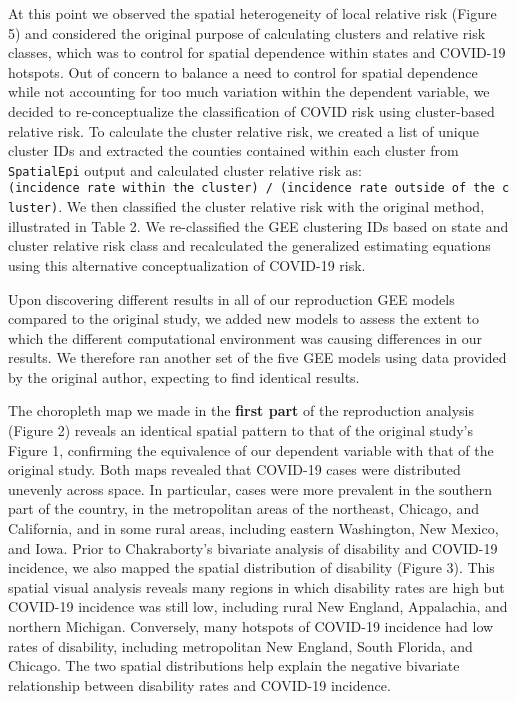 \documentclass[
]{article}
\begin{document}
At this point we observed the spatial heterogeneity of local relative
risk (Figure 5) and considered the original purpose of calculating
clusters and relative risk classes, which was to control for spatial
dependence within states and COVID-19 hotspots. Out of concern to
balance a need to control for spatial dependence while not accounting
for too much variation within the dependent variable, we decided to
re-conceptualize the classification of COVID risk using cluster-based
relative risk. To calculate the cluster relative risk, we created a list
of unique cluster IDs and extracted the counties contained within each
cluster from \texttt{SpatialEpi} output and calculated cluster relative
risk as:
\texttt{(incidence\ rate\ within\ the\ cluster)\ /\ (incidence\ rate\ outside\ of\ the\ cluster)}.
We then classified the cluster relative risk with the original method,
illustrated in Table 2. We re-classified the GEE clustering IDs based on
state and cluster relative risk class and recalculated the generalized
estimating equations using this alternative conceptualization of
COVID-19 risk.

Upon discovering different results in all of our reproduction GEE models
compared to the original study, we added new models to assess the extent
to which the different computational environment was causing differences
in our results. We therefore ran another set of the five GEE models
using data provided by the original author, expecting to find identical
results.

The choropleth map we made in the \textbf{first part} of the
reproduction analysis (Figure 2) reveals an identical spatial pattern to
that of the original study's Figure 1, confirming the equivalence of our
dependent variable with that of the original study. Both maps revealed
that COVID-19 cases were distributed unevenly across space. In
particular, cases were more prevalent in the southern part of the
country, in the metropolitan areas of the northeast, Chicago, and
California, and in some rural areas, including eastern Washington, New
Mexico, and Iowa. Prior to Chakraborty's bivariate analysis of
disability and COVID-19 incidence, we also mapped the spatial
distribution of disability (Figure 3). This spatial visual analysis
reveals many regions in which disability rates are high but COVID-19
incidence was still low, including rural New England, Appalachia, and
northern Michigan. Conversely, many hotspots of COVID-19 incidence had
low rates of disability, including metropolitan New England, South
Florida, and Chicago. The two spatial distributions help explain the
negative bivariate relationship between disability rates and COVID-19
incidence.
\end{document}

